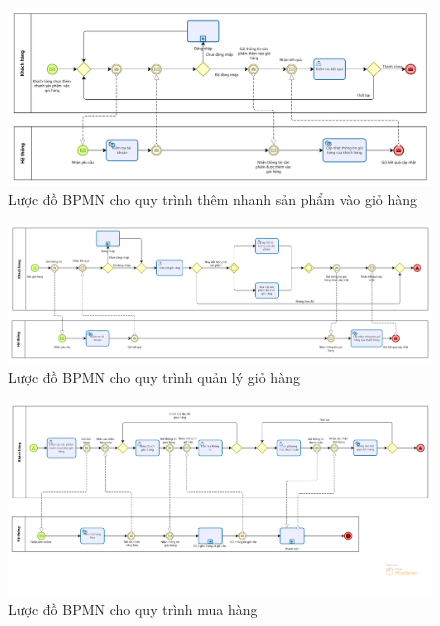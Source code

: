     \begin{figure}[!htp]
        \centering
        \includegraphics[width=17cm]{img/BPMN/customer_buy/customer_add_fast.png}
        \newline
        \caption{Lược đồ BPMN cho quy trình thêm nhanh sản phẩm vào giỏ hàng}
    \end{figure}
    \begin{figure}[!htp]
        \centering
        \includegraphics[width=17cm]{img/BPMN/customer_buy/customer_cart.png}
        \newline
        \caption{Lược đồ BPMN cho quy trình quản lý giỏ hàng}
    \end{figure}
    \begin{figure}[!htp]
        \centering
        \includegraphics[width=17cm]{img/BPMN/customer_buy/customer_buy_order.png}
        \newline
        \caption{Lược đồ BPMN cho quy trình mua hàng}
    \end{figure}
